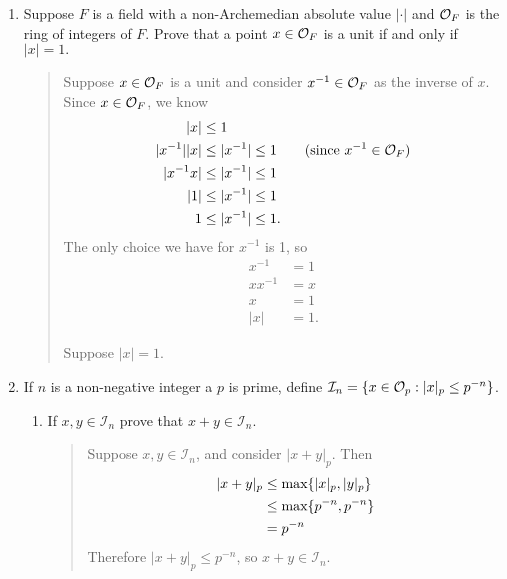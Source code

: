 \documentclass{hw}
\begin{document}
    \begin{enumerate}
        \item Suppose $F$ is a field with a non-Archemedian absolute value $|\cdot|$ and $\mathcal{O}_{F}$ is the ring of
        integers of $F$. Prove that a point $x\in\mathcal{O}_{F}$ is a unit if and only if $|x|=1.$
        \begin{quote}
            Suppose $x\in\mathcal{O}_{F}$ is a unit and consider $x^{-1}\in\mathcal{O}_{F}$ as the inverse of $x$. Since $x\in\mathcal{O}_{F}$, we know
            \begin{align*}
                |x| &\leq 1\\
                |x^{-1}||x| &\leq |x^{-1}|\leq1 \qquad\text{(since $x^{-1}\in\mathcal{O}_{F}$)}\\
                |x^{-1}x| &\leq |x^{-1}|\leq1\\
                |1| &\leq |x^{-1}| \leq1\\
                1 &\leq |x^{-1}| \leq 1.
            \end{align*}
            The only choice we have for $x^{-1}$ is 1, so
            \begin{align*}
                x^{-1} &= 1\\
                xx^{-1}&= x\\
                x&=1\\
                |x|&=1.
            \end{align*}

            Suppose $|x| = 1$. 
        \end{quote}

        \item If $n$ is a non-negative integer a $p$ is prime, define
        $\mathcal{I}_{n}=\{x\in\mathcal{O}_{p}:|x|_{p}\leq p^{-n}\}$.
        \begin{enumerate}
            \item If $x,y\in\mathcal{I}_{n}$ prove that $x+y\in\mathcal{I}_{n}$.
            \begin{quote}
                Suppose $x,y\in\mathcal{I}_{n}$, and consider $|x+y|_{p}$. Then
                \begin{align*}
                    |x+y|_{p} &\leq \text{max}\{ |x|_{p} , |y|_{p} \}\\
                    &\leq \text{max}\{ p^{-n} , p^{-n} \}\\
                    &= p^{-n}
                \end{align*}
                Therefore $|x+y|_{p}\leq p^{-n}$, so $x+y\in\mathcal{I}_{n}$.
            \end{quote}


\end{enumerate}
\end{enumerate}
\end{document}
